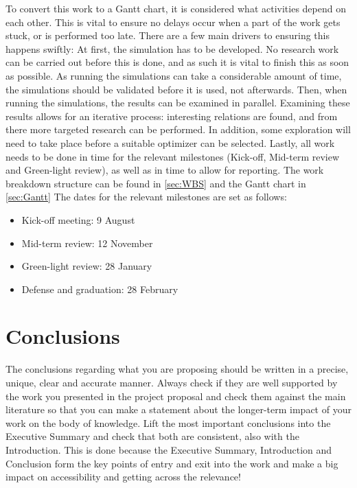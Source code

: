 \documentclass[12pt, english, NoHyper]{AE4010-template}
\begin{document}
To convert this work to a Gantt chart, it is considered what activities depend on each other. This is vital to ensure no delays occur when a part of the work gets stuck, or is performed too late. There are a few main drivers to ensuring this happens swiftly: At first, the simulation has to be developed. No research work can be carried out before this is done, and as such it is vital to finish this as soon as possible. As running the simulations can take a considerable amount of time, the simulations should be validated before it is used, not afterwards. Then, when running the simulations, the results can be examined in parallel. Examining these results allows for an iterative process: interesting relations are found, and from there more targeted research can be performed. In addition, some exploration will need to take place before a suitable optimizer can be selected. Lastly, all work needs to be done in time for the relevant milestones (Kick-off, Mid-term review and Green-light review), as well as in time to allow for reporting. The work breakdown structure can be found in \autoref{sec:WBS} and the Gantt chart in \autoref{sec:Gantt} The dates for the relevant milestones are set as follows:
\begin{itemize}
\setlength\itemsep{-0.5em}
 \item Kick-off meeting: 9 August
 \item Mid-term review: 12 November
 \item Green-light review: 28 January
 \item Defense and graduation: 28 February
\end{itemize}






\section{Conclusions}
The conclusions regarding what you are proposing should be written in a precise, unique, clear and accurate manner. Always check if they are well supported by the work you presented in the project proposal and check them against the main literature so that you can make a statement about the longer-term impact of your work on the body of knowledge. Lift the most important conclusions into the Executive Summary and check that both are consistent, also with the Introduction. This is done because the Executive Summary, Introduction and Conclusion form the key points of entry and exit into the work and make a big impact on accessibility and getting across the relevance!
\end{document}
